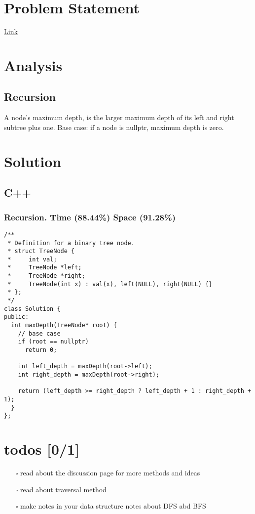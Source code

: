 \documentclass[12pt]{book}
\begin{document}
\section{Problem Statement}
\label{sec:orgcf39d53}
\href{https://leetcode.com/problems/maximum-depth-of-binary-tree/}{Link}
\section{Analysis}
\label{sec:org9553636}
\subsection{Recursion}
\label{sec:org82d2ff4}
A node's maximum depth, is the larger maximum depth of its left and right subtree plus one. Base case: if a node is nullptr, maximum depth is zero.
\section{Solution}
\label{sec:org3ad9961}
\subsection{C++}
\label{sec:orgc1d1910}
\subsubsection{Recursion. Time (88.44\%) Space (91.28\%)}
\label{sec:org097e431}
\begin{verbatim}
/**
 * Definition for a binary tree node.
 * struct TreeNode {
 *     int val;
 *     TreeNode *left;
 *     TreeNode *right;
 *     TreeNode(int x) : val(x), left(NULL), right(NULL) {}
 * };
 */
class Solution {
public:
  int maxDepth(TreeNode* root) {
    // base case 
    if (root == nullptr)
      return 0;

    int left_depth = maxDepth(root->left);
    int right_depth = maxDepth(root->right);

    return (left_depth >= right_depth ? left_depth + 1 : right_depth + 1);
  }
};
\end{verbatim}
\section{todos [0/1]}
\label{sec:orgc612c48}
\begin{itemize}
\item[{$\square$}] read about the discussion page for more methods and ideas
\item[{$\square$}] read about traversal method
\item[{$\square$}] make notes in your data structure notes about DFS abd BFS
\end{itemize}
\end{document}
